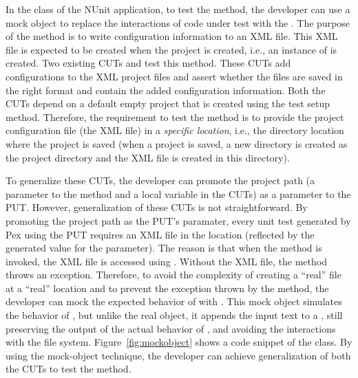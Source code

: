 In the  class of the NUnit application, to test the  method, the developer can use a mock object to replace the interactions of code under test with the . The purpose of the  method is to write configuration information to an XML file. This XML file is expected to be created when the project is created, i.e., an instance of  is created. Two existing CUTs  and  test this  method. These CUTs add configurations to the XML project files and assert whether the files are saved in the right format and contain the added configuration information. Both the CUTs depend on a default empty project that is created using the test setup method. Therefore, the requirement to test the  method is to provide the project configuration file (the XML file) in a \emph{specific location}, i.e., the directory location where the project is saved (when a project is saved, a new directory is created as the project directory and the XML file is created in this directory). 

To generalize these CUTs, the developer can promote the project path (a parameter to the  method and a local variable in the CUTs) as a parameter to the PUT. However, generalization of these CUTs is not straightforward. By promoting the project path as the PUT's paramater, every unit test generated by Pex using the PUT requires an XML file in the location (reflected by the generated value for the parameter). The reason is that when the  method is invoked, the XML file is accessed using . Without the XML file, the  method throws an exception. Therefore, to avoid the complexity of creating a ``real'' file at a ``real'' location and to prevent the exception thrown by the  method, the developer can mock the expected behavior of  with . This mock object simulates the behavior of , but unlike the real object, it appends the input text to a , still preserving the output of the actual behavior of , and avoiding the interactions with the file system. Figure~\ref{fig:mockobject} shows a code snippet of the  class. By using the mock-object technique, the developer can achieve generalization of both the CUTs to test the  method.



